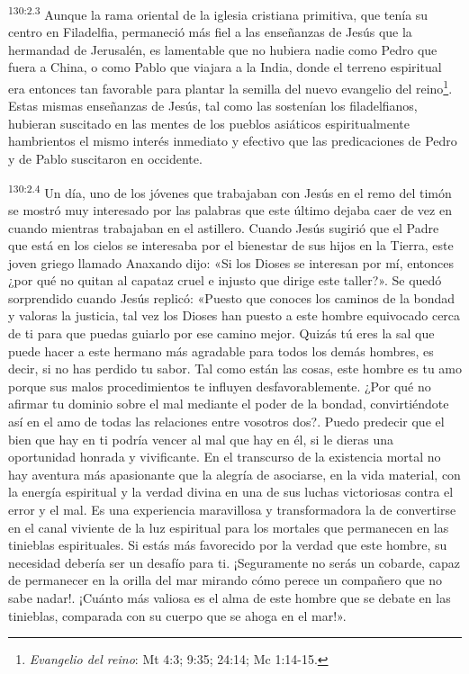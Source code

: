 \par
\textsuperscript{130:2.3} Aunque la rama oriental de la iglesia cristiana primitiva, que tenía su centro en Filadelfia, permaneció más fiel a las enseñanzas de Jesús que la hermandad de Jerusalén, es lamentable que no hubiera nadie como Pedro que fuera a China, o como Pablo que viajara a la India, donde el terreno espiritual era entonces tan favorable para plantar la semilla del nuevo evangelio del reino\footnote{\textit{Evangelio del reino}: Mt 4:3; 9:35; 24:14; Mc 1:14-15.}. Estas mismas enseñanzas de Jesús, tal como las sostenían los filadelfianos, hubieran suscitado en las mentes de los pueblos asiáticos espiritualmente hambrientos el mismo interés inmediato y efectivo que las predicaciones de Pedro y de Pablo suscitaron en occidente.

\par
\textsuperscript{130:2.4} Un día, uno de los jóvenes que trabajaban con Jesús en el remo del timón se mostró muy interesado por las palabras que este último dejaba caer de vez en cuando mientras trabajaban en el astillero. Cuando Jesús sugirió que el Padre que está en los cielos se interesaba por el bienestar de sus hijos en la Tierra, este joven griego llamado Anaxando dijo: «Si los Dioses se interesan por mí, entonces ¿por qué no quitan al capataz cruel e injusto que dirige este taller?». Se quedó sorprendido cuando Jesús replicó: «Puesto que conoces los caminos de la bondad y valoras la justicia, tal vez los Dioses han puesto a este hombre equivocado cerca de ti para que puedas guiarlo por ese camino mejor. Quizás tú eres la sal que puede hacer a este hermano más agradable para todos los demás hombres, es decir, si no has perdido tu sabor. Tal como están las cosas, este hombre es tu amo porque sus malos procedimientos te influyen desfavorablemente. ¿Por qué no afirmar tu dominio sobre el mal mediante el poder de la bondad, convirtiéndote así en el amo de todas las relaciones entre vosotros dos?. Puedo predecir que el bien que hay en ti podría vencer al mal que hay en él, si le dieras una oportunidad honrada y vivificante. En el transcurso de la existencia mortal no hay aventura más apasionante que la alegría de asociarse, en la vida material, con la energía espiritual y la verdad divina en una de sus luchas victoriosas contra el error y el mal. Es una experiencia maravillosa y transformadora la de convertirse en el canal viviente de la luz espiritual para los mortales que permanecen en las tinieblas espirituales. Si estás más favorecido por la verdad que este hombre, su necesidad debería ser un desafío para ti. ¡Seguramente no serás un cobarde, capaz de permanecer en la orilla del mar mirando cómo perece un compañero que no sabe nadar!. ¡Cuánto más valiosa es el alma de este hombre que se debate en las tinieblas, comparada con su cuerpo que se ahoga en el mar!».

